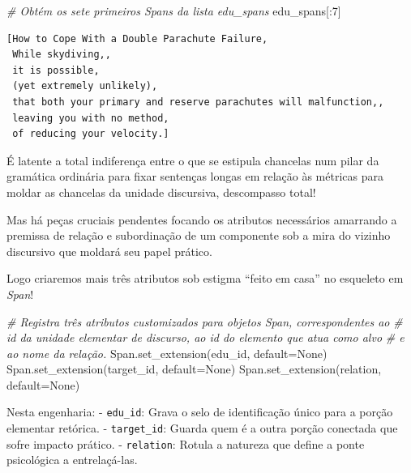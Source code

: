 \documentclass[
  brazilian,
]{article}
\newenvironment{Shaded}{}{}
\newcommand{\CommentTok}[1]{\textcolor[rgb]{0.38,0.63,0.69}{\textit{#1}}}
\newcommand{\DecValTok}[1]{\textcolor[rgb]{0.25,0.63,0.44}{#1}}
\newcommand{\NormalTok}[1]{#1}
\newcommand{\OperatorTok}[1]{\textcolor[rgb]{0.40,0.40,0.40}{#1}}
\newcommand{\StringTok}[1]{\textcolor[rgb]{0.25,0.44,0.63}{#1}}
\newcommand{\VariableTok}[1]{\textcolor[rgb]{0.10,0.09,0.49}{#1}}
\begin{document}
\begin{Shaded}
\begin{Highlighting}[]
\CommentTok{\# Obtém os sete primeiros Spans da lista \textquotesingle{}edu\_spans\textquotesingle{}}
\NormalTok{edu\_spans[:}\DecValTok{7}\NormalTok{]}
\end{Highlighting}
\end{Shaded}

\begin{verbatim}
[How to Cope With a Double Parachute Failure,
 While skydiving,,
 it is possible,
 (yet extremely unlikely),
 that both your primary and reserve parachutes will malfunction,,
 leaving you with no method,
 of reducing your velocity.]
\end{verbatim}

É latente a total indiferença entre o que se estipula chancelas num
pilar da gramática ordinária para fixar sentenças longas em relação às
métricas para moldar as chancelas da unidade discursiva, descompasso
total!

Mas há peças cruciais pendentes focando os atributos necessários
amarrando a premissa de relação e subordinação de um componente sob a
mira do vizinho discursivo que moldará seu papel prático.

Logo criaremos mais três atributos sob estigma ``feito em casa'' no
esqueleto em \emph{Span}!

\begin{Shaded}
\begin{Highlighting}[]
\CommentTok{\# Registra três atributos customizados para objetos Span, correspondentes ao}
\CommentTok{\# id da unidade elementar de discurso, ao id do elemento que atua como alvo}
\CommentTok{\# e ao nome da relação.}
\NormalTok{Span.set\_extension(}\StringTok{\textquotesingle{}edu\_id\textquotesingle{}}\NormalTok{, default}\OperatorTok{=}\VariableTok{None}\NormalTok{)}
\NormalTok{Span.set\_extension(}\StringTok{\textquotesingle{}target\_id\textquotesingle{}}\NormalTok{, default}\OperatorTok{=}\VariableTok{None}\NormalTok{)}
\NormalTok{Span.set\_extension(}\StringTok{\textquotesingle{}relation\textquotesingle{}}\NormalTok{, default}\OperatorTok{=}\VariableTok{None}\NormalTok{)}
\end{Highlighting}
\end{Shaded}

Nesta engenharia: - \texttt{edu\_id}: Grava o selo de identificação
único para a porção elementar retórica. - \texttt{target\_id}: Guarda
quem é a outra porção conectada que sofre impacto prático. -
\texttt{relation}: Rotula a natureza que define a ponte psicológica a
entrelaçá-las.
\end{document}
